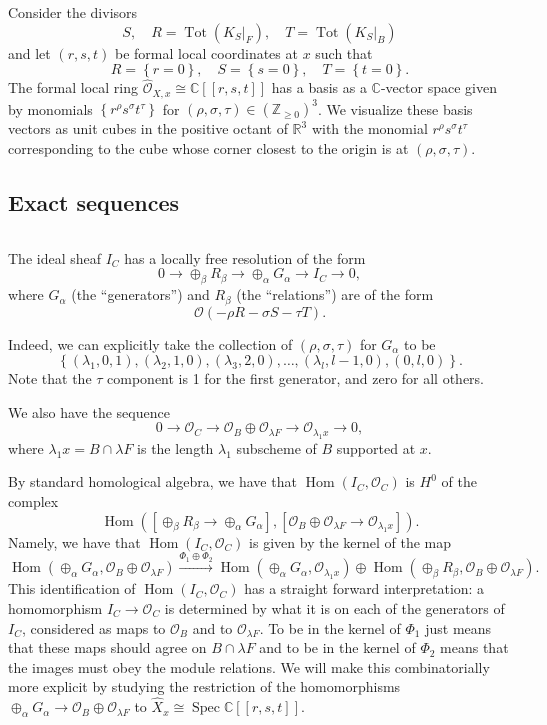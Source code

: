 \documentclass[12pt]{amsart}
\theoremstyle{definition}
\newcommand{\CC} {\mathbb{C}}          %
\newcommand{\RR} {\mathbb{R}}		%
\newcommand{\ZZ} {\mathbb{Z}}		%
\renewcommand{\O}{\mathcal{O}}
\newcommand{\Hom}{\operatorname{Hom}}
\newcommand{\Tot}{\operatorname{Tot}}
\newcommand{\Spec}{\operatorname{Spec}}
\newcommand{\SubSecSpace}{$\,$\vspace{0.2cm}\par } %
\begin{document}
Consider the divisors
\[
S,\quad R=\Tot (K_{S}|_{F}),\quad T=\Tot (K_{S}|_{B})
\]
and let $(r,s,t)$ be formal local coordinates at $x$ such that 
\[
R=\left\{r=0 \right\},\quad S=\left\{s=0 \right\},\quad T=\left\{t=0 \right\}.
\]
The formal local ring $\widehat{\O}_{X,x}\cong \CC [[r,s,t]]$ has a basis
as a $\CC$-vector space given by monomials
$\left\{r^{\rho}s^{\sigma}t^{\tau} \right\}$ for $(\rho, \sigma,
\tau)\in \left(\ZZ_{\geq 0} \right)^{3}$. We visualize these basis
vectors as unit cubes in the positive octant of $\RR^{3}$ with the
monomial $r^{\rho}s^{\sigma}t^{\tau}$ corresponding to the cube whose
corner closest to the origin is at $(\rho ,\sigma ,\tau)$.


\subsection{Exact sequences}\SubSecSpace 

The ideal sheaf $I_{C}$ has a locally free resolution of the form
\begin{equation}\label{eqn: R-->G-->I_C exact sequence}
0\to \oplus_{\beta}R_{\beta} \to \oplus_{\alpha }G_{\alpha } \to I_{C}
\to 0,
\end{equation}
where $G_{\alpha}$ (the ``generators'') and $R_{\beta}$ (the
``relations'') are of the form 
\[
\O (-\rho R-\sigma S-\tau T).
\]

Indeed, we can explicitly take the collection of $(\rho ,\sigma
,\tau)$ for $G_{\alpha}$ to be 
\[
\left\{(\lambda_{1},0,1),(\lambda_{2},1,0),(\lambda_{3},2,0),\dotsc
,(\lambda_{l},l-1,0),(0,l,0) \right\}.
\]
Note that the $\tau$ component is 1 for the first generator, and zero
for all others.

We also have the sequence
\[
0\to \O_{C} \to \O_{B}\oplus\O_{\lambda F}\to \O_{\lambda_{1}x}\to 0,
\]
where $\lambda_{1}x=B\cap \lambda F$ is the length $\lambda_{1}$
subscheme of $B$ supported at $x$.

By standard homological algebra, we have that $\Hom (I_{C},\O_{C})$ is
$H^{0}$ of the complex
\[
\Hom \left(\left[\oplus_{\beta}R_{\beta}\to
\oplus_{\alpha}G_{\alpha} \right],[\O_{B}\oplus \O_{\lambda F}\to
\O_{\lambda_{1}x}] \right).
\]
Namely, we have that $\Hom (I_{C},\O_{C})$ is given by the kernel of
the map
\[
\Hom (\oplus_{\alpha}G_{\alpha},\O_{B}\oplus \O_{\lambda
F}) \xrightarrow{\Phi_{1}\oplus \Phi_{2}}
\Hom(\oplus_{\alpha}G_{\alpha},\O_{\lambda_{1}x})\oplus \Hom
(\oplus_{\beta}R_{\beta},\O_{B}\oplus \O_{\lambda F}).
\]
This identification of $\Hom (I_{C},\O_{C})$ has a straight forward
interpretation: a homomorphism $I_{C}\to \O_C$ is determined by what
it is on each of the generators of $I_{C}$, considered as maps to
$\O_{B}$ and to $\O_{\lambda F}$. To be in the kernel of $\Phi_{1}$
just means that these maps should agree on $B\cap \lambda F$ and to be
in the kernel of $\Phi_{2}$ means that the images must obey the module
relations. We will make this combinatorially more explicit by studying
the restriction of the homomorphisms $\oplus_{\alpha}G_{\alpha}\to
\O_{B}\oplus \O_{\lambda F}$ to $\widehat{X}_{x}\cong \Spec \CC
[[r,s,t]]$.
\end{document}
